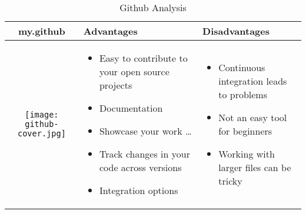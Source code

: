 \documentclass{article}
\begin{document}
	\begin{table}[h!]
		\centering
		\begin{tabular}{ | c | m{5cm} | m{5cm} | }
			\hline
			my.github & Advantages & Disadvantages \\ \hline
			\begin{minipage}{.4\textwidth}
				\texttt{[image: github-cover.jpg]}
			\end{minipage}
		&
		\begin{itemize}
			\item Easy to contribute to your open source projects
			\item Documentation
			\item Showcase your work \ldots
			\item Track changes in your code across versions
			\item Integration options
		\end{itemize}
				&
				\begin{itemize}
					\item Continuous integration leads to problems
					\item Not an easy tool for beginners 
					\item Working with larger files can be tricky
				\end{itemize}
			\\
			\hline
		\end{tabular}
	\caption{Github Analysis}\label{tbl:mygitHub}
			
		
	\end{table}
\end{document}
